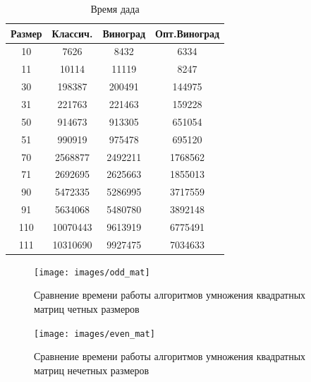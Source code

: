 \documentclass[12pt]{report}
\begin{document}
    \begin{table}[h]
        \begin{center}
            \captionsetup{justification=raggedleft, singlelinecheck=false}
            \caption{\label{table:time} Время дада}
            \begin{tabular}{|c c c c|}
                \hline
                Размер & Классич. & Виноград & Опт.Виноград\\ [0.5ex]
                \hline
                10     & 7626     & 8432     & 6334         \\
                \hline
                11     & 10114    & 11119    & 8247         \\
                \hline
                30     & 198387   & 200491   & 144975       \\
                \hline
                31     & 221763   & 221463   & 159228       \\
                \hline
                50     & 914673   & 913305   & 651054       \\
                \hline
                51     & 990919   & 975478   & 695120       \\
                \hline
                70     & 2568877  & 2492211  & 1768562      \\
                \hline
                71     & 2692695  & 2625663  & 1855013      \\
                \hline
                90     & 5472335  & 5286995  & 3717559      \\
                \hline
                91     & 5634068  & 5480780  & 3892148      \\
                \hline
                110    & 10070443 & 9613919  & 6775491      \\
                \hline
                111    & 10310690 & 9927475  & 7034633      \\
                \hline
            \end{tabular}
        \end{center}
    \end{table}

    \begin{figure}[H]
        \centering
        \texttt{[image: images/odd\_mat]}
        \caption{Сравнение времени работы алгоритмов умножения квадратных матриц четных размеров}
        \label{fig:odd_graph}
    \end{figure}

    \begin{figure}[H]
        \centering
        \texttt{[image: images/even\_mat]}
        \caption{Сравнение времени работы алгоритмов умножения квадратных матриц нечетных размеров}
        \label{fig:even_graph}
    \end{figure}
\end{document}
